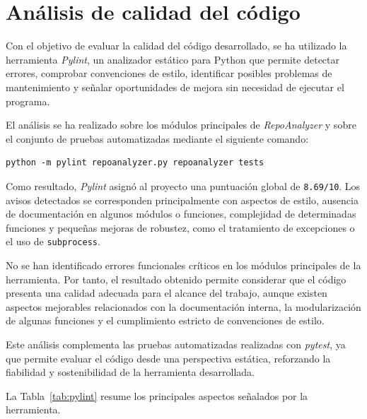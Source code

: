 \documentclass[a4paper, 12pt]{book}
\begin{document}
\section{Análisis de calidad del código}
\label{sec:calidad_codigo}

Con el objetivo de evaluar la calidad del código desarrollado, se ha utilizado la herramienta \emph{Pylint}, un analizador estático para Python que permite detectar errores, comprobar convenciones de estilo, identificar posibles problemas de mantenimiento y señalar oportunidades de mejora sin necesidad de ejecutar el programa.

El análisis se ha realizado sobre los módulos principales de \emph{RepoAnalyzer} y sobre el conjunto de pruebas automatizadas mediante el siguiente comando:

\begin{verbatim}
python -m pylint repoanalyzer.py repoanalyzer tests
\end{verbatim}

Como resultado, \emph{Pylint} asignó al proyecto una puntuación global de \texttt{8.69/10}. Los avisos detectados se corresponden principalmente con aspectos de estilo, ausencia de documentación en algunos módulos o funciones, complejidad de determinadas funciones y pequeñas mejoras de robustez, como el tratamiento de excepciones o el uso de \texttt{subprocess}.

No se han identificado errores funcionales críticos en los módulos principales de la herramienta. Por tanto, el resultado obtenido permite considerar que el código presenta una calidad adecuada para el alcance del trabajo, aunque existen aspectos mejorables relacionados con la documentación interna, la modularización de algunas funciones y el cumplimiento estricto de convenciones de estilo.

Este análisis complementa las pruebas automatizadas realizadas con \emph{pytest}, ya que permite evaluar el código desde una perspectiva estática, reforzando la fiabilidad y sostenibilidad de la herramienta desarrollada.

La Tabla~\ref{tab:pylint} resume los principales aspectos señalados por la herramienta.
\end{document}
